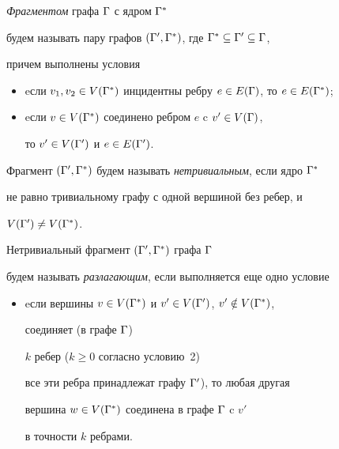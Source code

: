 \begin{defn}


{\it Фрагментом} графа ${\Gamma}$ с ядром ${\Gamma}^*$


будем называть пару графов $({\Gamma}', {\Gamma}^*)$, где ${\Gamma}^*\subseteq {\Gamma}'\subseteq {\Gamma}$,


причем выполнены условия


\begin{itemize}


\item[1)]


eсли $v_1, v_2\in V({\Gamma}^*)$ инцидентны ребру $e\in E({\Gamma})$, то $e\in E({\Gamma}^*)$;


\item[2)]


eсли $v\in V({\Gamma}^*)$ соединено ребром $e$ c $v'\in V({\Gamma})$,


то $v'\in V({\Gamma}')$ и $e\in E({\Gamma}')$.


\end{itemize}





Фрагмент $({\Gamma}', {\Gamma}^*)$ будем называть {\it нетривиальным}, если ядро ${\Gamma}^*$


не равно тривиальному графу с одной вершиной без ребер, и


$V({\Gamma}')\ne V({\Gamma}^*)$.





Нетривиальный фрагмент $({\Gamma}', {\Gamma}^*)$ графа ${\Gamma}$ 


будем называть {\it разлагающим}, если выполняется еще одно условие


\begin{itemize}


\item[3)]


eсли вершины $v\in V({\Gamma}^*)$ и $v'\in V({\Gamma}')$, $v'\notin V({\Gamma}^*)$, 


соединяет (в графе ${\Gamma}$)


$k$ ребер ($k\geq 0$ согласно условию~2) 


все эти ребра принадлежат графу ${\Gamma}'$), то любая другая


вершина $w\in V({\Gamma}^*)$ соединена в графе ${\Gamma}$ c $v'$ 


в точности $k$ ребрами.


\end{itemize}


\end{defn}





